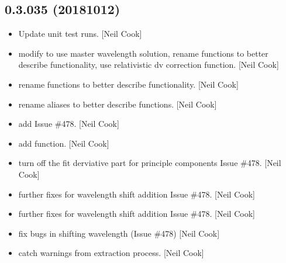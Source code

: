 \documentclass[a4paper,10pt,english]{report}
\begin{document}
\subsection{0.3.035 (2018\sphinxhyphen{}10\sphinxhyphen{}12)}
\label{\detokenize{misc/changelog:id315}}\begin{itemize}
\item {} 
Update unit test runs. {[}Neil Cook{]}

\item {} 
 \sphinxhyphen{} modify  to use master
wavelength solution, rename functions to better describe
functionality, use relativistic dv correction function. {[}Neil Cook{]}

\item {} 
 \sphinxhyphen{} rename functions to better describe functionality.
{[}Neil Cook{]}

\item {} 
 \sphinxhyphen{} rename aliases to better describe functions.
{[}Neil Cook{]}

\item {} 
 \sphinxhyphen{} add  \sphinxhyphen{} Issue \#478. {[}Neil
Cook{]}

\item {} 
 \sphinxhyphen{} add  function. {[}Neil Cook{]}

\item {} 
 \sphinxhyphen{} turn off the fit derviative part for
principle components \sphinxhyphen{} Issue \#478. {[}Neil Cook{]}

\item {} 
 \sphinxhyphen{} further fixes for wavelength shift addition \sphinxhyphen{}
Issue \#478. {[}Neil Cook{]}

\item {} 
 \sphinxhyphen{} further fixes for wavelength shift addition \sphinxhyphen{} Issue
\#478. {[}Neil Cook{]}

\item {} 
 \sphinxhyphen{} fix bugs in shifting wavelength (Issue \#478) {[}Neil
Cook{]}

\item {} 
 \sphinxhyphen{} catch warnings from extraction process.
{[}Neil Cook{]}


\end{itemize}
\end{document}

